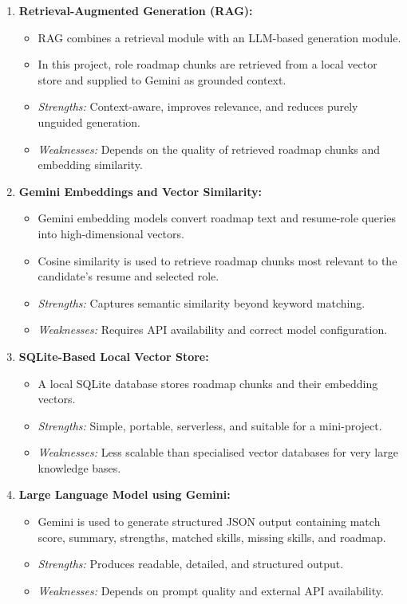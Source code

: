 \documentclass[12pt,a4paper]{report}
\begin{document}
\begin{enumerate}
  \item \textbf{Retrieval-Augmented Generation (RAG):}
  \begin{itemize}
    \item RAG combines a retrieval module with an LLM-based generation module.
    \item In this project, role roadmap chunks are retrieved from a local vector
          store and supplied to Gemini as grounded context.
    \item \textit{Strengths:} Context-aware, improves relevance, and reduces
          purely unguided generation.
    \item \textit{Weaknesses:} Depends on the quality of retrieved roadmap chunks
          and embedding similarity.
  \end{itemize}

  \item \textbf{Gemini Embeddings and Vector Similarity:}
  \begin{itemize}
    \item Gemini embedding models convert roadmap text and resume-role queries
          into high-dimensional vectors.
    \item Cosine similarity is used to retrieve roadmap chunks most relevant to
          the candidate's resume and selected role.
    \item \textit{Strengths:} Captures semantic similarity beyond keyword
          matching.
    \item \textit{Weaknesses:} Requires API availability and correct model
          configuration.
  \end{itemize}

  \item \textbf{SQLite-Based Local Vector Store:}
  \begin{itemize}
    \item A local SQLite database stores roadmap chunks and their embedding
          vectors.
    \item \textit{Strengths:} Simple, portable, serverless, and suitable for a
          mini-project.
    \item \textit{Weaknesses:} Less scalable than specialised vector databases
          for very large knowledge bases.
  \end{itemize}

  \item \textbf{Large Language Model using Gemini:}
  \begin{itemize}
    \item Gemini is used to generate structured JSON output containing match
          score, summary, strengths, matched skills, missing skills, and roadmap.
    \item \textit{Strengths:} Produces readable, detailed, and structured output.
    \item \textit{Weaknesses:} Depends on prompt quality and external API
          availability.
  \end{itemize}


\end{enumerate}
\end{document}
